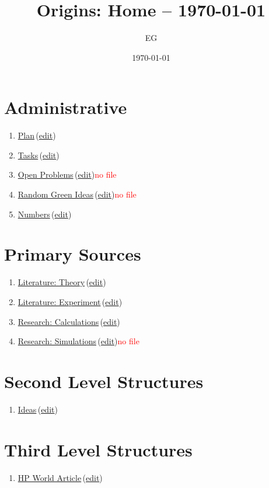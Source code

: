 \documentclass[12pt]{paper}
\title{Origins: Home -- \today}
\author{EG}
\date{\today}
\newcommand{\red}[1]{\textcolor{red}{#1}}
\newcommand{\wikilink}[2] { \href{#1.pdf}{#2}\,(\href{#1.tex}{edit})}
\begin{document}
 \maketitle
 \tableofcontents
 
\section{Administrative}


\begin{enumerate}
 \item \wikilink{plan}{Plan}
 \item \wikilink{tasks}{Tasks}
 \item \wikilink{open\_problems}{Open Problems}\red{no file}
 \item \wikilink{green\_ideas}{Random Green Ideas}\red{no file}
 \item \wikilink{numbers}{Numbers}
 
\end{enumerate}

\section{Primary Sources}
\begin{enumerate}
 \item \wikilink{literature\_theory}{Literature: Theory}
 \item \wikilink{literature\_experiment}{Literature: Experiment}
 \item \wikilink{research\_calculations}{Research: Calculations}
 \item \wikilink{research\_simulations}{Research: Simulations}\red{no file}
\end{enumerate}

\section{Second Level Structures}
\begin{enumerate}
 \item \wikilink{ideas}{Ideas}
\end{enumerate}

\section{Third Level Structures}


\begin{enumerate}
 \item \wikilink{hp\_world}{HP World Article}
\end{enumerate}




% 
% 

 
\end{document}
